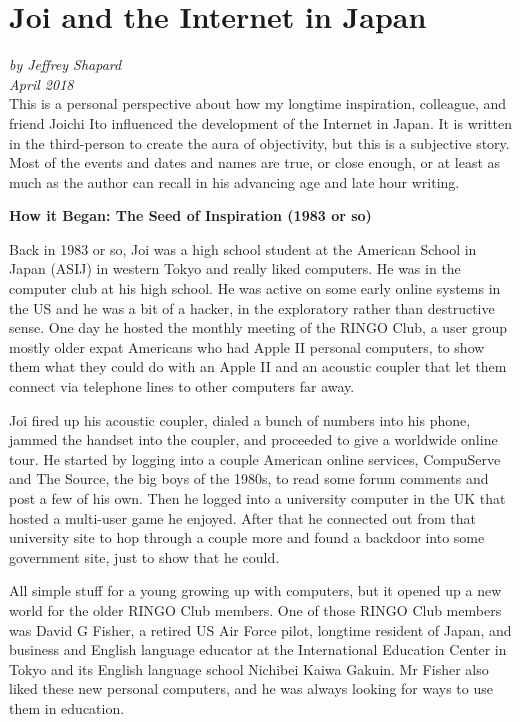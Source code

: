 
\chapter{Joi and the Internet in Japan}
\label{chap:jefu}

\textit{by Jeffrey Shapard} \\
\textit{April 2018} \\

This is a personal perspective about how my longtime inspiration, colleague, and friend Joichi Ito influenced the development of the Internet in Japan. It is written in the third-person to create the aura of objectivity, but this is a subjective story. Most of the events and dates and names are true, or close enough, or at least as much as the author can recall in his advancing age and late hour writing. 


\textbf{How it Began: The Seed of Inspiration (1983 or so)}

Back in 1983 or so, Joi was a high school student at the American School in Japan (ASIJ) in western Tokyo and really liked computers. He was in the computer club at his high school. He was active on some early online systems in the US and he was a bit of a hacker, in the exploratory rather than destructive sense. One day he hosted the monthly meeting of the RINGO Club, a user group mostly older expat Americans who had Apple II personal computers, to show them what they could do with an Apple II and an acoustic coupler that let them connect via telephone lines to other computers far away.

Joi fired up his acoustic coupler, dialed a bunch of numbers into his phone, jammed the handset into the coupler, and proceeded to give a worldwide online tour. He started by logging into a couple American online services, CompuServe and The Source, the big boys of the 1980s, to read some forum comments and post a few of his own. Then he logged into a university computer in the UK that hosted a multi-user game he enjoyed. After that he connected out from that university site to hop through a couple more and found a backdoor into some government site, just to show that he could. 

All simple stuff for a young growing up with computers, but it opened up a new world for the older RINGO Club members. One of those RINGO Club members was David G Fisher, a retired US Air Force pilot, longtime resident of Japan, and business and English language educator at the International Education Center in Tokyo and its English language school Nichibei Kaiwa Gakuin. Mr Fisher also liked these new personal computers, and he was always looking for ways to use them in education.

